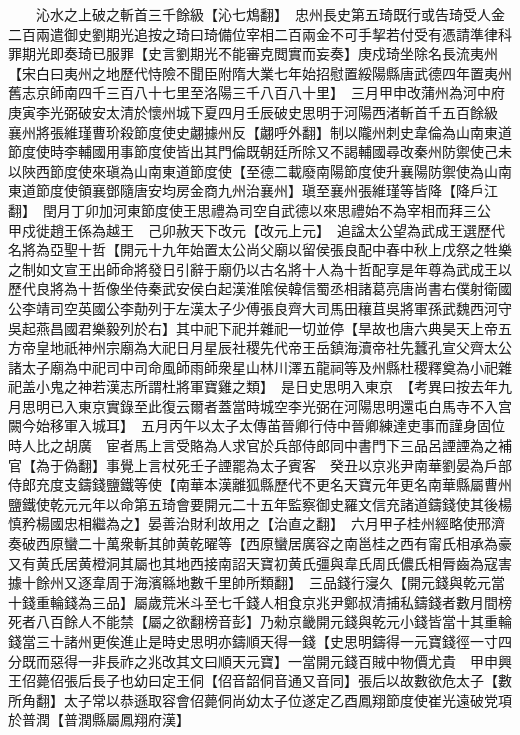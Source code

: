 　　沁水之上破之斬首三千餘級【沁七鴆翻】　忠州長史第五琦既行或告琦受人金二百兩遣御史劉期光追按之琦曰琦備位宰相二百兩金不可手挈若付受有憑請準律科罪期光即奏琦已服罪【史言劉期光不能審克閲實而妄奏】庚戍琦坐除名長流夷州【宋白曰夷州之地歷代恃險不聞臣附隋大業七年始招慰置綏陽縣唐武德四年置夷州舊志京師南四千三百八十七里至洛陽三千八百八十里】　三月甲申改蒲州為河中府　庚寅李光弼破安太清於懷州城下夏四月壬辰破史思明于河陽西渚斬首千五百餘級　襄州將張維瑾曹玠殺節度使史翽據州反【翽呼外翻】制以隴州刺史韋倫為山南東道節度使時李輔國用事節度使皆出其門倫既朝廷所除又不謁輔國尋改秦州防禦使己未以陜西節度使來瑱為山南東道節度使【至德二載廢南陽節度使升襄陽防禦使為山南東道節度使領襄鄧隨唐安均房金商九州治襄州】瑱至襄州張維瑾等皆降【降戶江翻】　閏月丁卯加河東節度使王思禮為司空自武德以來思禮始不為宰相而拜三公　甲戍徙趙王係為越王　己卯赦天下改元【改元上元】　追諡太公望為武成王選歷代名將為亞聖十哲【開元十九年始置太公尚父廟以留侯張良配中春中秋上戊祭之牲樂之制如文宣王出師命將發日引辭于廟仍以古名將十人為十哲配享是年尊為武成王以歷代良將為十哲像坐侍秦武安侯白起漢淮隂侯韓信蜀丞相諸葛亮唐尚書右僕射衛國公李靖司空英國公李勣列于左漢太子少傅張良齊大司馬田穰苴吳將軍孫武魏西河守吳起燕昌國君樂毅列於右】其中祀下祀并雜祀一切並停【旱故也唐六典昊天上帝五方帝皇地祇神州宗廟為大祀日月星辰社稷先代帝王岳鎮海瀆帝社先蠶孔宣父齊太公諸太子廟為中祀司中司命風師雨師衆星山林川澤五龍祠等及州縣杜稷釋奠為小祀雜祀盖小鬼之神若漢志所謂杜將軍寶雞之類】　是日史思明入東京　【考異曰按去年九月思明已入東京實錄至此復云爾者蓋當時城空李光弼在河陽思明還屯白馬寺不入宫闕今始移軍入城耳】　五月丙午以太子太傳苖晉卿行侍中晉卿練達吏事而謹身固位時人比之胡廣　宦者馬上言受賂為人求官於兵部侍郎同中書門下三品呂諲諲為之補官【為于偽翻】事覺上言杖死壬子諲罷為太子賓客　癸丑以京兆尹南華劉晏為戶部侍郎充度支鑄錢鹽鐵等使【南華本漢離狐縣歷代不更名天寶元年更名南華縣屬曹州鹽鐵使乾元元年以命第五琦會要開元二十五年監察御史羅文信充諸道鑄錢使其後楊慎矜楊國忠相繼為之】晏善治財利故用之【治直之翻】　六月甲子桂州經略使邢濟奏破西原蠻二十萬衆斬其帥黄乾曜等【西原蠻居廣容之南邕桂之西有甯氏相承為豪又有黄氏居黄橙洞其屬也其地西接南詔天寶初黄氏彊與韋氏周氏儂氏相脣齒為寇害據十餘州又逐韋周于海濱緜地數千里帥所類翻】　三品錢行寖久【開元錢與乾元當十錢重輪錢為三品】屬歲荒米斗至七千錢人相食京兆尹鄭叔清捕私鑄錢者數月間榜死者八百餘人不能禁【屬之欲翻榜音彭】乃勑京畿開元錢與乾元小錢皆當十其重輪錢當三十諸州更俟進止是時史思明亦鑄順天得一錢【史思明鑄得一元寶錢徑一寸四分既而惡得一非長祚之兆改其文曰順天元寶】一當開元錢百賊中物價尤貴　甲申興王佋薨佋張后長子也幼曰定王侗【佋音韶侗音通又音同】張后以故數欲危太子【數所角翻】太子常以恭遜取容會佋薨侗尚幼太子位遂定乙酉鳳翔節度使崔光遠破党項於普潤【普潤縣屬鳳翔府漢】

